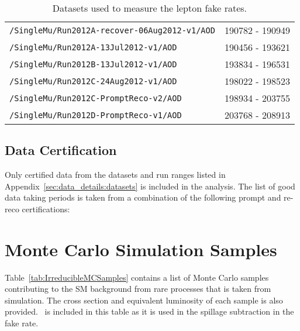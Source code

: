 \begin{table}[hbt]
\begin{center}
\begin{tabular}{lc}
\verb=/SingleMu/Run2012A-recover-06Aug2012-v1/AOD=                    &     190782 - 190949                  \\ 
\verb=/SingleMu/Run2012A-13Jul2012-v1/AOD=                                     &  190456 - 193621                     \\ 
\verb=/SingleMu/Run2012B-13Jul2012-v1/AOD=                                     &  193834 - 196531 \\ 
\verb=/SingleMu/Run2012C-24Aug2012-v1/AOD=                                   &   198022 - 198523                   \\ 
\verb=/SingleMu/Run2012C-PromptReco-v2/AOD=                                  &   198934 - 203755                    \\ 
\verb=/SingleMu/Run2012D-PromptReco-v1/AOD=                                  &  203768 - 208913   \\
 \hline\hline
\end{tabular}
\caption{\label{tab:FRDsets}Datasets used to measure the lepton fake rates.}
\end{center}
\end{table}

\subsection{Data Certification}
\label{sec:data_details:cert}

Only certified data from the datasets and run ranges listed in Appendix~\ref{sec:data_details:datasets} is included in the analysis.  The list of good data taking periods is taken from a combination of the following prompt and re-reco certifications:


\clearpage	
	
	
	
	
\section{Monte Carlo Simulation Samples}
\label{sec:MCSamples}


Table~\ref{tab:IrreducibleMCSamples} contains a list of Monte Carlo samples contributing to the SM background from rare processes that is taken from simulation.  The cross section and equivalent luminosity of each sample is also provided. \ttZ \ is included in this table as it is used in the spillage subtraction in the fake rate.

